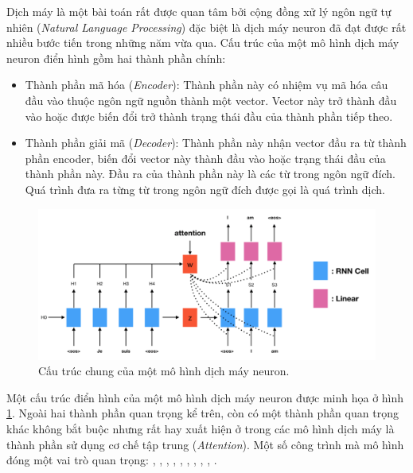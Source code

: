 \documentclass[14pt, a4paper]{article}
\numberwithin{equation}{section}
\numberwithin{algorithm}{section}
\numberwithin{figure}{section}
\numberwithin{table}{section}
\numberwithin{dl}{section}
\numberwithin{md}{section}
\numberwithin{bd}{section}
\numberwithin{dn}{section}
\numberwithin{hq}{section}
\begin{document}
    Dịch máy là một bài toán rất được quan tâm bởi cộng đồng xử lý ngôn ngữ tự nhiên (\textit{Natural Language Processing}) đặc biệt là dịch máy neuron đã đạt được rất nhiều bước tiến trong những năm vừa qua.
    Cấu trúc của một mô hình dịch máy neuron điển hình gồm hai thành phần chính:

    \begin{itemize}
        \item Thành phần mã hóa (\textit{Encoder}): Thành phần này có nhiệm vụ mã hóa câu đầu vào thuộc ngôn ngữ nguồn thành một vector. Vector này trở thành đầu vào hoặc được biến đổi trở thành trạng thái đầu của thành phần tiếp theo.
        \item Thành phần giải mã (\textit{Decoder}): Thành phần này nhận vector đầu ra từ thành phần encoder, biến đổi vector này thành đầu vào hoặc trạng thái đầu của thành phần này. Đầu ra của thành phần này là các từ trong ngôn ngữ đích. Quá trình đưa ra từng từ trong ngôn ngữ đích được gọi là quá trình dịch.
    \end{itemize}

    \begin{figure}[h!] \centering

        \includegraphics[scale=0.35]{Neural_Machine_Translation_Architecture.png}
        \caption{Cấu trúc chung của một mô hình dịch máy neuron.}
    
        \label{fig:Neural_Machine_Translation_Architecture}
    \end{figure}

    Một cấu trúc điển hình của một mô hình dịch máy neuron được minh họa ở hình \ref{fig:Neural_Machine_Translation_Architecture}.
    Ngoài hai thành phần quan trọng kể trên, còn có một thành phần quan trọng khác không bắt buộc nhưng rất hay xuất hiện ở trong các mô hình dịch máy là thành phần sử dụng cơ chế tập trung (\textit{Attention}).
    Một số công trình mà mô hình đóng một vai trò quan trọng: \cite{bahdanau2014neural}, \cite{luong2014addressing}, \cite{jean2014using}, \cite{luong2015effective}, \cite{tang2016neural}, \cite{wang2016memory}, \cite{li2016towards}, \cite{tu2016modeling}, \cite{shen2015minimum}, \cite{zhou2016deep}.
\end{document}
